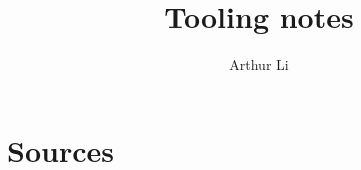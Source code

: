 \documentclass[a4paper,oneside,openany]{book}
\title{Tooling notes}
\author{Arthur Li}
\begin{document}
\maketitle
\tableofcontents
\mainmatter


\backmatter
\chapter{Sources}

\end{document}
